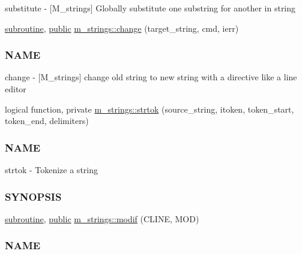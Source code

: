 \begin{DoxyCompactItemize}
\begin{DoxyCompactList}
substitute -\/ \mbox{[}M\+\_\+strings\mbox{]} Globally substitute one substring for another in string \end{DoxyCompactList}\item 
\hyperlink{M__stopwatch_83_8txt_acfbcff50169d691ff02d4a123ed70482}{subroutine}, \hyperlink{M__stopwatch_83_8txt_a2f74811300c361e53b430611a7d1769f}{public} \hyperlink{namespacem__strings_a1222f3b718f7637105bde330367925e1}{m\+\_\+strings\+::change} (target\+\_\+string, cmd, ierr)
\begin{DoxyCompactList}\small\item\em \subsubsection*{N\+A\+ME}

change -\/ \mbox{[}M\+\_\+strings\mbox{]} change old string to new string with a directive like a line editor \end{DoxyCompactList}\item 
logical function, private \hyperlink{namespacem__strings_a9a923829f31ea70ecada6d214536a704}{m\+\_\+strings\+::strtok} (source\+\_\+string, itoken, token\+\_\+start, token\+\_\+end, delimiters)
\begin{DoxyCompactList}\small\item\em \subsubsection*{N\+A\+ME}

strtok -\/ Tokenize a string \subsubsection*{S\+Y\+N\+O\+P\+S\+IS}\end{DoxyCompactList}\item 
\hyperlink{M__stopwatch_83_8txt_acfbcff50169d691ff02d4a123ed70482}{subroutine}, \hyperlink{M__stopwatch_83_8txt_a2f74811300c361e53b430611a7d1769f}{public} \hyperlink{namespacem__strings_aec887410b018916a683fbb2ae529f8c5}{m\+\_\+strings\+::modif} (C\+L\+I\+NE, M\+OD)
\begin{DoxyCompactList}\small\item\em \subsubsection*{N\+A\+ME}


\end{DoxyCompactList}
\end{DoxyCompactItemize}

